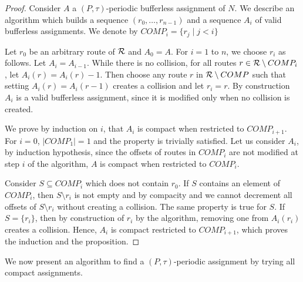 \documentclass[a4paper,10pt]{article}
\begin{document}
\begin{proof}
Consider $A$ a $(P,\tau)$-periodic bufferless assignment of $N$.
We describe an algorithm which builds a sequence $(r_0,\dots,r_{n-1})$ and a sequence  
$A_i$ of valid bufferless assignments. We denote by $COMP_i = \{ r_j \mid j < i\}$

Let $r_0$ be an arbitrary route of ${\cal R}$ and $A_0 = A$. For $i = 1$ to $n$, we choose $r_i$ as follows.
Let $A_{i} = A_{i-1}$. While there is no collision, for all routes $r \in {\cal R} \setminus COMP_i$, let $A_i(r) = A_i(r) - 1$. Then choose any route $r$ in ${\cal R} \setminus COMP$ such that setting $A_i(r) = A_i(r-1)$ creates a collision and let $r_i = r$. By construction $A_i$ is a valid bufferless assignment, since it is modified only when no collision is created.

We prove by induction on $i$, that $A_i$ is compact when restricted to $COMP_{i+1}$.
For $i = 0$, $|COMP_1| = 1$ and the property is trivially satisfied. Let us consider $A_i$,
by induction hypothesis, since the offsets of routes in $COMP_{i}$ are not modified at step $i$ of the algorithm, $A$ is compact when restricted to $COMP_{i}$. 

 Consider $S \subseteq COMP_i$ which does not contain $r_0$. If $S$ contains
an element of $COMP_{i}$, then $S \setminus {r_i}$ is not empty and by compacity and we cannot decrement all offsets of $S\setminus {r_i}$ without creating a collision. The same property is true for $S$. If $S = \{r_i\}$, then by construction of $r_i$ by the algorithm, removing one from $A_i(r_i)$ creates a collision. Hence,
$A_i$ is compact restricted to $COMP_{i+1}$, which proves the induction and the proposition.
\end{proof}

We now present an algorithm to find a $(P,\tau)$-periodic assignment by trying all compact assignments.
\end{document}
